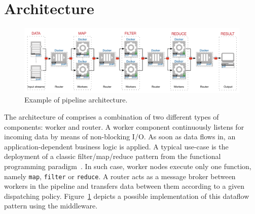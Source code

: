 \section{Architecture}
\label{sec:architecture}
\begin{figure}[!t]
  \centering
  \includegraphics[scale=0.5]{images/architecture_pipeline}
  \caption{Example of \SYS pipeline architecture.}
  \label{fig:architecture_pipeline}
\end{figure}


The architecture of \SYS{} comprises a combination of two different types of components: \textsf{worker} and \textsf{router}.
A worker component continuously listens for incoming data by means of non-blocking I/O.
As soon as data flows in, an application-dependent business logic is applied.
A typical use-case is the deployment of a classic filter/map/reduce pattern from the functional programming paradigm~\cite{bird_introduction_1988}.
In such case, worker nodes execute only one function, namely \texttt{map}, \texttt{filter} or \texttt{reduce}.
A router acts as a message broker between workers in the pipeline and transfers data between them according to a given dispatching policy.
Figure~\ref{fig:architecture_pipeline} depicts a possible implementation of this dataflow pattern using the \SYS middleware.

